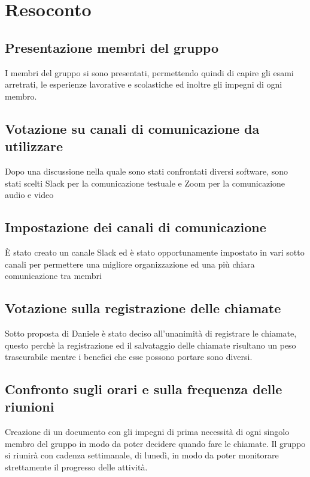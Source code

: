 \section{Resoconto}

\subsection{Presentazione membri del gruppo}

I membri del gruppo si sono presentati, permettendo quindi di capire gli esami arretrati, le esperienze lavorative e scolastiche ed inoltre gli impegni di ogni membro.

\subsection{Votazione su canali di comunicazione da utilizzare}

Dopo una discussione nella quale sono stati confrontati diversi software, sono stati scelti Slack per la comunicazione testuale e Zoom per la comunicazione audio e video

\subsection{Impostazione dei canali di comunicazione}

È stato creato un canale Slack ed è stato opportunamente impostato in vari sotto canali per permettere una migliore organizzazione ed una più chiara comunicazione tra membri

\subsection{Votazione sulla registrazione delle chiamate}

Sotto proposta di Daniele è stato deciso all'unanimità di registrare le chiamate, questo perchè la registrazione ed il salvataggio delle chiamate risultano un peso trascurabile mentre i benefici che esse possono portare sono diversi.

\subsection{Confronto sugli orari e sulla frequenza delle riunioni}

Creazione di un documento con gli impegni di prima necessità di ogni singolo membro del gruppo in modo da poter decidere quando fare le chiamate. Il gruppo si riunirà con cadenza settimanale, di lunedì, in modo da poter monitorare strettamente il progresso delle attività.


